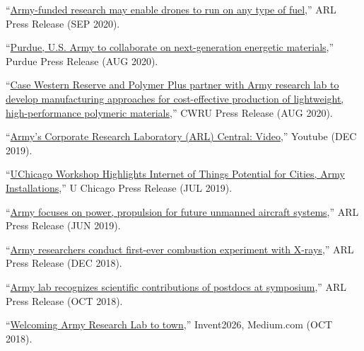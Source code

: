 \begin{cvlist}
\item
``\href{https://www.army.mil/article/239240}{Army-funded research may enable drones to run on any type of fuel},'' ARL Press Release (SEP 2020).

\item
``\href{https://www.purdue.edu/newsroom/releases/2020/Q3/purdue,-u.s.-army-to-collaborate-on-next-generation-energetic-materials.html}{Purdue, U.S. Army to collaborate on next-generation energetic materials},'' Purdue Press Release (AUG 2020).

\item
``\href{https://thedaily.case.edu/u-s-army-commits-up-to-11-million-for-polymer-research/}{Case Western Reserve and Polymer Plus partner with Army research lab to develop manufacturing approaches for cost-effective production of lightweight, high-performance polymeric materials},'' CWRU Press Release (AUG 2020).

\item
``\href{https://www.youtube.com/watch?v=ZZYnXnp1FEw}{Army's Corporate Research Laboratory (ARL) Central: Video},'' Youtube (DEC 2019).

\item
``\href{https://computerscience.uchicago.edu/news/article/smart-cities-bases/}{UChicago Workshop Highlights Internet of Things Potential for Cities, Army Installations},'' U Chicago Press Release (JUL 2019).

\item
``{\href{https://www.army.mil/article/222975/army_focuses_on_power_propulsion_for_future_unmanned_aircraft_systems}{Army focuses on power, propulsion for future unmanned aircraft systems}},'' ARL Press Release (JUN 2019).

\item
``\href{https://www.army.mil/article/203716/army_researchers_conduct_first_ever_combustion_experiment_with_x_rays}{Army researchers conduct first-ever combustion experiment with X-rays},'' ARL Press Release (DEC 2018).

\item
``\href{https://www.army.mil/article/212535/army_lab_recognizes_scientific_contributions_of_postdocs_at_symposium}{Army lab recognizes scientific contributions of postdocs at symposium},'' ARL Press Release (OCT 2018).

\item
``\href{https://medium.com/invent2026/welcoming-army-research-lab-to-town-d29dd9c36ec5}{Welcoming Army Research Lab to town},'' Invent2026, Medium.com (OCT 2018).


\end{cvlist}
